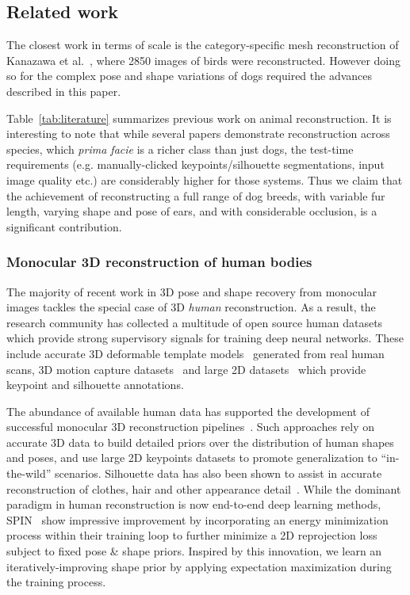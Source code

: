 \subsection{Related work}

The closest work in terms of scale is the category-specific mesh reconstruction of Kanazawa et al.~\cite{kanazawa2018birds}, where 2850 images of birds were reconstructed.  However doing so for the complex pose and shape variations of dogs required the advances described in this paper.

Table~\ref{tab:literature} summarizes previous work on animal reconstruction.
It is interesting to note that while several papers demonstrate reconstruction across species, which {\em prima facie} is a richer class than just dogs, the test-time requirements (e.g. manually-clicked keypoints/silhouette segmentations, input image quality etc.) are considerably higher for those systems.
Thus we claim that the achievement of reconstructing a full range of dog breeds, 
with variable fur length, varying shape and pose of ears, and with considerable occlusion, is a significant contribution.



\subsubsection{Monocular 3D reconstruction of human bodies}
The majority of recent work in 3D pose and shape recovery from monocular images tackles the special case of 3D \emph{human} reconstruction. As a result, the research community has collected a multitude of open source human datasets which provide strong supervisory signals for training deep neural networks. These include accurate 3D deformable template models~\cite{loper15smpl} generated from real human scans, 3D motion capture datasets~\cite{ionescu2013human3,vonmarcard2018recovering} and large 2D datasets~\cite{lin2014microsoft,johnson2010clustered,andriluka14cvpr} which provide keypoint and silhouette annotations. 

The abundance of available human data has supported the development of successful monocular 3D reconstruction pipelines~\cite{kolotouros19convolutional,kanazawa18end-to-end}. Such approaches rely on accurate 3D data to build detailed priors over the distribution of human shapes and poses, and use large 2D keypoints datasets to promote generalization to ``in-the-wild'' scenarios. Silhouette data has also been shown to assist in accurate reconstruction of clothes, hair and other appearance detail~\cite{pifuSHNMKL19,alldieck2019learning}.
While the dominant paradigm in human reconstruction is now end-to-end deep learning methods, SPIN~\cite{kolotouros19learning} show impressive improvement by incorporating an energy minimization process within their training loop to further minimize a 2D reprojection loss subject to fixed pose \& shape priors. Inspired by this innovation, we learn an iteratively-improving shape prior by applying expectation maximization during the training process.

